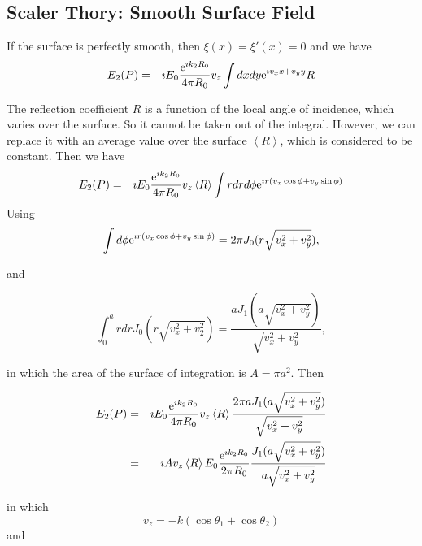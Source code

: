 \documentclass[11pt]{article}
\newcommand{\e}{{\rm e}}
\begin{document}
{{{{%
\subsection{Scaler Thory: Smooth Surface Field}

If the surface is perfectly smooth, then $\xi(x)=\xi'(x)=0$ and we have
\begin{eqnarray}
E_{2}(P)&=&\imath  E_{0}\frac{\e^{\imath k_{2}R_{0}}}{4\pi R_{0}}v_{z}
\int dx dy\e^{\imath v_{x}x+v_{y}y}R
\end{eqnarray}

The reflection coefficient $R$ is a function of the local angle of
incidence, which varies over the surface.  So it cannot be taken out
of the integral. However, we can replace it with an average value over
the surface $\left<R\right>$, which is considered to be constant. Then
we have 
  \begin{eqnarray} E_{2}(P)&=&\imath E_{0}\frac{\e^{\imath
k_{2}R_{0}}}{4\pi R_{0}}v_{z}\left<R\right>\int rdr d\phi\e^{\imath
r(v_{x}\cos\phi+v_{y}\sin\phi)}
  \end{eqnarray}
Using
  \begin{equation}
\int d\phi\e^{\imath r(v_{x}\cos\phi+v_{y}\sin\phi)}=2\pi J_{0}(r\sqrt{v_{x}^{2}+v_{y}^{2}}),
  \end{equation}

and

   \begin{equation}
\int_{0}^{a}rdrJ_{0}(r\sqrt{v_{x}^{2}+v_{2}^{2}})=
\frac{aJ_{1}(a\sqrt{v_{x}^{2}+v_{y}^{2}})}{\sqrt{v_{x}^{2}+v_{y}^{2}}},
  \end{equation}
 
 in which the area of the surface of integration is $A=\pi a^{2}.$ Then

\begin{eqnarray}
E_{2}(P)&=&\imath  E_{0}\frac{\e^{\imath k_{2}R_{0}}}{4\pi R_{0}}v_{z}\left<R\right>\frac{2\pi aJ_{1}(a\sqrt{v_{x}^{2}+v_{y}^{2}})}{\sqrt{v_{x}^{2}+v_{y}^{2}}}\\
&=&\imath  Av_{z}\left<R\right>E_{0}\frac{\e^{\imath k_{2}R_{0}}}{2\pi R_{0}}\frac{J_{1}(a\sqrt{v_{x}^{2}+v_{y}^{2}})}{a\sqrt{v_{x}^{2}+v_{y}^{2}}}\end{eqnarray}

in which 
  \begin{equation}
v_{z}=-k(\cos{\theta_{1}}+\cos{\theta_{2}})
  \end{equation}
and

}}}}
\end{document}
